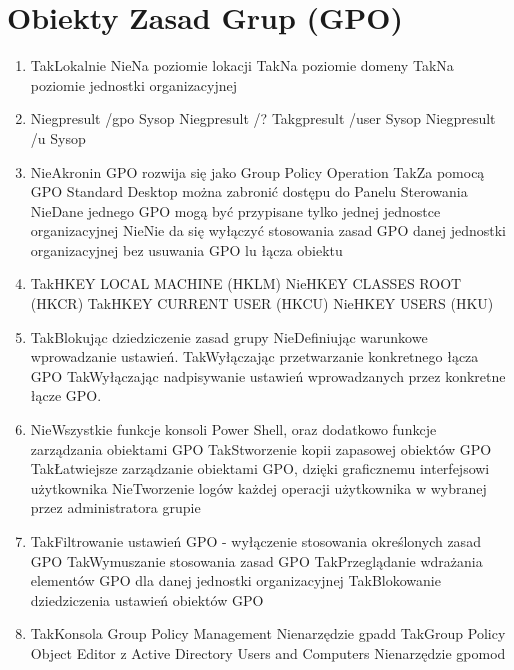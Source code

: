 \newpage
\section{Obiekty Zasad Grup (GPO)}
	\begin{enumerate}
		\item {}%
		{Tak}{Lokalnie}%
		{Nie}{Na poziomie lokacji}%
		{Tak}{Na poziomie domeny}%
		{Tak}{Na poziomie jednostki organizacyjnej}%
		
		\item {}%
		{Nie}{gpresult /gpo Sysop}%
		{Nie}{gpresult /?}%
		{Tak}{gpresult /user Sysop}%
		{Nie}{gpresult /u Sysop}
		
		\item {}%
		{Nie}{Akronin GPO rozwija się jako Group Policy Operation}%
		{Tak}{Za pomocą GPO Standard Desktop można zabronić dostępu do Panelu Sterowania}%
		{Nie}{Dane jednego GPO mogą być przypisane tylko jednej jednostce organizacyjnej}%
		{Nie}{Nie da się wyłączyć stosowania zasad GPO danej jednostki organizacyjnej bez usuwania GPO lu łącza obiektu}
		
		\item {}%
		{Tak}{HKEY LOCAL MACHINE (HKLM)}%
		{Nie}{HKEY CLASSES ROOT (HKCR)}%
		{Tak}{HKEY CURRENT USER (HKCU)}%
		{Nie}{HKEY USERS (HKU)}
		
		\item {}%
		{Tak}{Blokując dziedziczenie zasad grupy}%
		{Nie}{Definiując warunkowe wprowadzanie ustawień.}%
		{Tak}{Wyłączając przetwarzanie konkretnego łącza GPO}%
		{Tak}{Wyłączając nadpisywanie ustawień wprowadzanych przez konkretne łącze GPO.}
		
		\item {}%
		{Nie}{Wszystkie funkcje konsoli Power Shell, oraz dodatkowo funkcje zarządzania obiektami GPO}%
		{Tak}{Stworzenie kopii zapasowej obiektów GPO}%
		{Tak}{Łatwiejsze zarządzanie obiektami GPO, dzięki graficznemu interfejsowi użytkownika}%
		{Nie}{Tworzenie logów każdej operacji użytkownika w wybranej przez administratora grupie}
		
		\item {}%
		{Tak}{Filtrowanie ustawień GPO - wyłączenie stosowania określonych zasad GPO}%
		{Tak}{Wymuszanie stosowania zasad GPO}%
		{Tak}{Przeglądanie wdrażania elementów GPO dla danej jednostki organizacyjnej}%
		{Tak}{Blokowanie dziedziczenia ustawień obiektów GPO}
		
		\item {}%
		{Tak}{Konsola Group Policy Management}%
		{Nie}{narzędzie gpadd}%
		{Tak}{Group Policy Object Editor z Active Directory Users and Computers}%
		{Nie}{narzędzie gpomod}
		
		
	\end{enumerate}